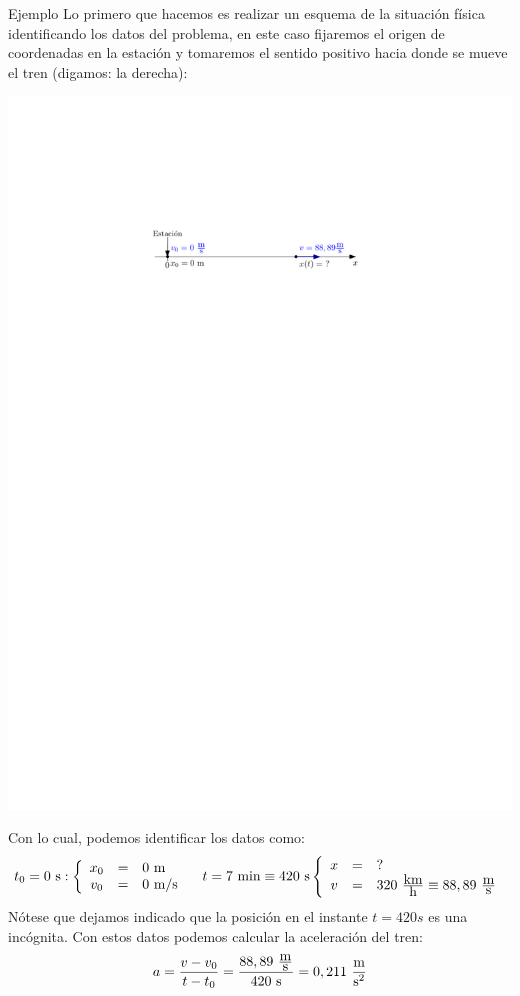 \begin{example}{Ejemplo}
Lo primero que hacemos es realizar un esquema de la situación física identificando los datos del problema, en este caso fijaremos el origen de coordenadas en la estación y tomaremos el sentido positivo hacia donde se mueve el tren (digamos: la derecha):
  \begin{center}
    \includegraphics[]{img/tgv.pdf}
  \end{center}
  Con lo cual, podemos identificar los datos como:
  \begin{equation*}
	t_0=0\ \mbox{s}:
	\left\{
	\begin{array}{ccl}
	x_0 & = & 0\ \mbox{m}\\
	v_0 & = & 0\ \mbox{m/s}\\
	\end{array}
	\right.
	\quad
	t=7\ \mbox{min}\equiv 420 \ \mbox{s}
	\left\{
	\begin{array}{ccl}
	x & = & ?\\
	v & = & 320\ \frac{\mbox{km}}{\mbox{h}}\equiv 88,89 \ \frac{\mbox{m}}{\mbox{s}}\\
	\end{array}
	\right.
	\end{equation*}
  Nótese que dejamos indicado que la posición en el instante $t=420\si{s}$ es una incógnita. Con estos datos podemos calcular la aceleración del tren:
$$a=\frac{v-v_0}{t-t_0}=\frac{88,89\ \frac{\mbox{m}}{\mbox{s}}}{420\ \mbox{s}}=0,211\ \frac{\mbox{m}}{\mbox{s$^2$}}$$
  

\end{example}
